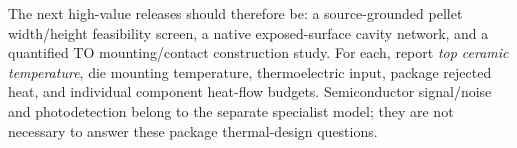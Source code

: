 The next high-value releases should therefore be:
a source-grounded pellet width/height feasibility screen,
a native exposed-surface cavity network,
and a quantified TO mounting/contact construction
study. For each, report \emph{top ceramic temperature},
die mounting temperature, thermoelectric input,
package rejected heat, and individual component
heat-flow budgets. Semiconductor signal/noise and
photodetection belong to the separate specialist model;
they are not necessary to answer these package
thermal-design questions.
\clearpage
